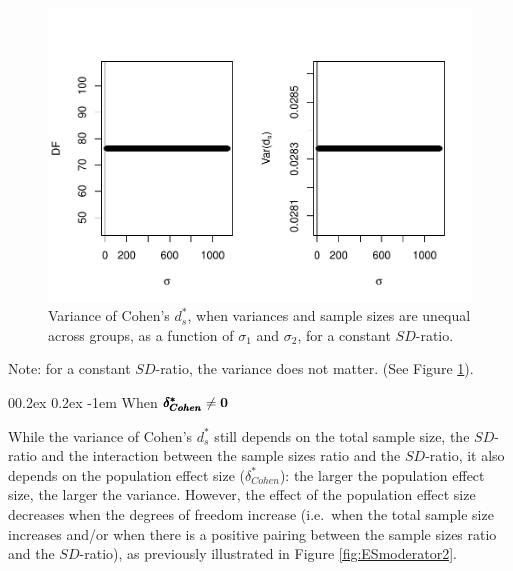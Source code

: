 \documentclass[
  english,
  man]{apa6}
\makeatletter
\let\oldparagraph\paragraph
\renewcommand{\paragraph}[1]{\oldparagraph{#1}\mbox{}}
\renewcommand{\paragraph}{\@startsection{paragraph}{4}{\parindent}%
  {0\baselineskip \@plus 0.2ex \@minus 0.2ex}%
  {-1em}%
  {\normalfont\normalsize\bfseries\itshape\typesectitle}}
\makeatother
\begin{document}
\begin{figure}
\centering
\includegraphics{Theoretical-Variance-of-all-estimators-as-a-function-of-population-parameters_files/figure-latex/varcohendprimehetunbalvariance2-1.pdf}
\caption{\label{fig:varcohendprimehetunbalvariance2}Variance of Cohen's \(d^*_s\), when variances and sample sizes are unequal across groups, as a function of \(\sigma_1\) and \(\sigma_2\), for a constant \(SD\)-ratio.}
\end{figure}

Note: for a constant \(SD\)-ratio, the variance does not matter. (See Figure \ref{fig:varcohendprimehetunbalvariance2}).

\hypertarget{when-bf-pmbdelta_cohen-neq-0-3}{%
\paragraph{\texorpdfstring{When \(\bf \pmb{\delta^*_{Cohen}} \neq 0\)}{When \textbackslash bf \textbackslash pmb\{\textbackslash delta\^{}*\_\{Cohen\}\} \textbackslash neq 0}}\label{when-bf-pmbdelta_cohen-neq-0-3}}

While the variance of Cohen's \(d^*_s\) still depends on the total sample size, the \(SD\)-ratio and the interaction between the sample sizes ratio and the \(SD\)-ratio, it also depends on the population effect size (\(\delta^*_{Cohen}\)): the larger the population effect size, the larger the variance. However, the effect of the population effect size decreases when the degrees of freedom increase (i.e.~when the total sample size increases and/or when there is a positive pairing between the sample sizes ratio and the \(SD\)-ratio), as previously illustrated in Figure \ref{fig:ESmoderator2}.
\end{document}
